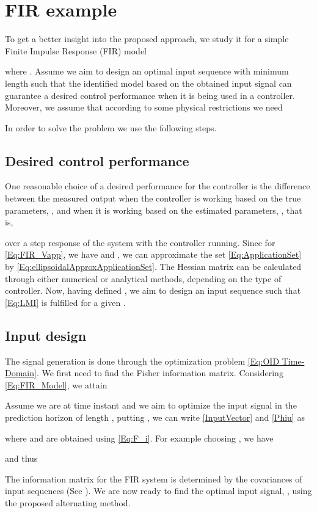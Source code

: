 \documentclass{ifacconf}
\begin{document}
\section{FIR example}
\label{FIR example}
To get a better insight into the proposed approach, we study it for a simple Finite Impulse Response (FIR) model

where . Assume we aim to design an optimal input sequence with minimum length such that the identified model based on the obtained input signal can guarantee a desired control performance when it is being used in a controller. Moreover, we assume that according to some physical restrictions we need

In order to solve the problem we use the following steps.
\subsection{Desired control performance}
One reasonable choice of a desired performance for the controller is the difference between the measured output when the controller is working based on the true parameters, , and when it is working based on the estimated parameters, , that is,

over a step response of the system with the controller running.
Since for \eqref{Eq:FIR_Vapp}, we have  and ,
we can approximate the set \eqref{Eq:ApplicationSet} by \eqref{Eq:ellipsoidalApproxApplicationSet}. The Hessian matrix can be calculated through either numerical or analytical methods, depending on the type of controller. Now, having defined , we aim to design an input sequence such that \eqref{Eq:LMI} is fulfilled for a given .

\subsection{Input design}
The signal generation is done through the optimization problem \eqref{Eq:OID Time-Domain}. We first need to find the Fisher information matrix. Considering \eqref{Eq:FIR_Model}, we attain

Assume we are at time instant  and we aim to optimize the input signal in the prediction horizon of length , putting , we can write \eqref{InputVector} and \eqref{Phiu} as

where  and  are obtained using \eqref{Eq:F_i}. For example choosing , we have

and thus

The information matrix for the FIR system is determined by the covariances of input sequences (See \cite{Stoica1982}). We are now ready to find the optimal input signal, , using the proposed alternating method.
\end{document}
